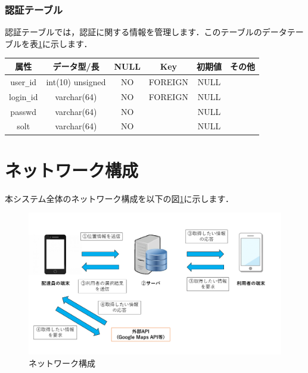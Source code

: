 \documentclass[a4j,titlepage]{jarticle}
\begin{document}
\subsubsection{認証テーブル}
認証テーブルでは，認証に関する情報を管理します．このテーブルのデータテーブルを表\ref{authTable}に示します．
\begin{table}[htb]
  \label{authTable}
  \begin{center}
    \begin{tabular}{|c|c|c|c|c|c|} \hline
      属性 & データ型/長 & NULL & Key & 初期値 & その他 \\ \hline \hline
      user\verb|_|id & int(10) unsigned & NO & FOREIGN & NULL & \\ \hline
      login\verb|_|id & varchar(64) & NO & FOREIGN  & NULL & \\ \hline
      passwd & varchar(64) & NO &   & NULL & \\ \hline
      solt & varchar(64) & NO &  & NULL & \\ \hline
    \end{tabular}
  \end{center}
\end{table}

\section{ネットワーク構成}
本システム全体のネットワーク構成を以下の図\ref{fig:i_f}に示します．

\begin{figure}[H]
 \begin{center}
  \includegraphics[width=140mm]{information_flow.png}
	\caption{ネットワーク構成}
	\label{fig:i_f}
 \end{center}

\end{figure}
\end{document}
